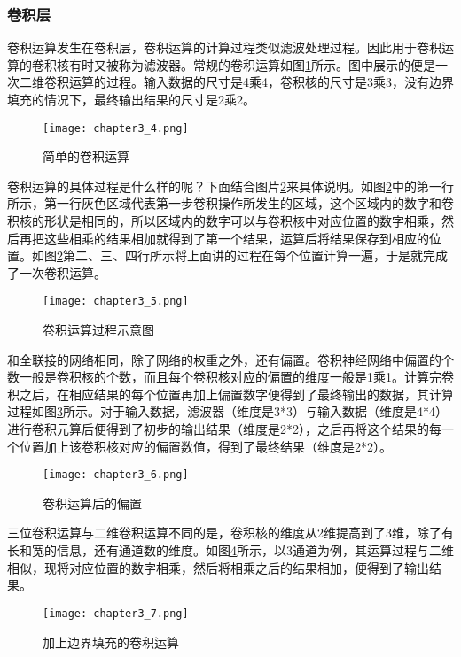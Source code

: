 \subsubsection{卷积层}
卷积运算发生在卷积层，卷积运算的计算过程类似滤波处理过程。因此用于卷积运算的卷积核有时又被称为滤波器。常规的卷积运算如图\ref{fig:chapter3_4}所示。图中展示的便是一次二维卷积运算的过程。输入数据的尺寸是4乘4，卷积核的尺寸是3乘3，没有边界填充的情况下，最终输出结果的尺寸是2乘2。
\begin{figure}
    \centering
    \texttt{[image: chapter3\_4.png]}
    \caption{简单的卷积运算\cite{luyujie_204}}
    \label{fig:chapter3_4}
\end{figure}
卷积运算的具体过程是什么样的呢？下面结合图片\ref{fig:chapter3_5}来具体说明。如图\ref{fig:chapter3_5}中的第一行所示，第一行灰色区域代表第一步卷积操作所发生的区域，这个区域内的数字和卷积核的形状是相同的，所以区域内的数字可以与卷积核中对应位置的数字相乘，然后再把这些相乘的结果相加就得到了第一个结果，运算后将结果保存到相应的位置。如图\ref{fig:chapter3_5}第二、三、四行所示将上面讲的过程在每个位置计算一遍，于是就完成了一次卷积运算。
\begin{figure}
    \centering
    \texttt{[image: chapter3\_5.png]}
    \caption{卷积运算过程示意图\cite{luyujie_205}}
    \label{fig:chapter3_5}
\end{figure}
和全联接的网络相同，除了网络的权重之外，还有偏置。卷积神经网络中偏置的个数一般是卷积核的个数，而且每个卷积核对应的偏置的维度一般是1乘1。计算完卷积之后，在相应结果的每个位置再加上偏置数字便得到了最终输出的数据，其计算过程如图\ref{fig:chapter3_6}所示。对于输入数据，滤波器（维度是3*3）与输入数据（维度是4*4）进行卷积元算后便得到了初步的输出结果（维度是2*2），之后再将这个结果的每一个位置加上该卷积核对应的偏置数值，得到了最终结果（维度是2*2）。
\begin{figure}
    \centering
    \texttt{[image: chapter3\_6.png]}
    \caption{卷积运算后的偏置\cite{luyujie_206}}
    \label{fig:chapter3_6}
\end{figure}
三位卷积运算与二维卷积运算不同的是，卷积核的维度从2维提高到了3维，除了有长和宽的信息，还有通道数的维度。如图\ref{fig:chapter3_7}所示，以3通道为例，其运算过程与二维相似，现将对应位置的数字相乘，然后将相乘之后的结果相加，便得到了输出结果。
\begin{figure}
    \centering
    \texttt{[image: chapter3\_7.png]}
    \caption{加上边界填充的卷积运算\cite{luyujie_206}}
    \label{fig:chapter3_7}
\end{figure}
